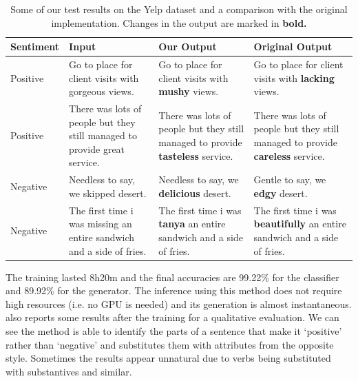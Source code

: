 \documentclass[nomenclature, english, biblatex]{kththesis}
\begin{document}
\begin{table}
    \centering
    \begin{adjustbox}{max width=\textwidth}
        \begin{tabular}{|p{}|p{}|p{}|p{}|}
        \hline
        Sentiment & Input & Our Output & Original Output \\
        \hline
        \hline
        Positive & Go to place for client visits with gorgeous views. & Go to place for client visits with \textbf{mushy} views. & Go to place for client visits with \textbf{lacking} views.\\
        \hline
        Positive & There was lots of people but they still managed to provide great service. & There was lots of people but they still managed to provide \textbf{tasteless} service. & There was lots of people but they still managed to provide \textbf{careless} service.\\
        \hline
        Negative & Needless to say, we skipped desert. & Needless to say, we \textbf{delicious} desert. & Gentle to say, we \textbf{edgy} desert. \\
        \hline
        Negative & The first time i was missing an entire sandwich and a side of fries. & The first time i was \textbf{tanya} an entire sandwich and a side of fries. & The first time i was \textbf{beautifully} an entire sandwich and a side of fries.\\
        \hline
        \end{tabular}
    \end{adjustbox}
    \caption{Some of our test results on the Yelp dataset and a comparison with the original implementation. Changes in the output are marked in \textbf{bold.}}
    \label{tab:yelp_results}
\end{table}
The training lasted 8h20m and the final accuracies are 99.22\% for the classifier and 89.92\% for the generator. The inference using this method does not require high resources (i.e. no GPU is needed) and its generation is almost instantaneous.  also reports some results after the training for a qualitative evaluation. We can see the method is able to identify the parts of a sentence that make it `positive' rather than `negative' and substitutes them with attributes from the opposite style. Sometimes the results appear unnatural due to verbs being substituted with substantives and similar.
\end{document}
